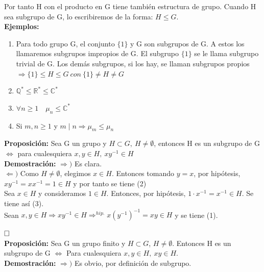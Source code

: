 \documentclass{article}
\begin{document}
Por tanto H con el producto en G tiene también estructura de grupo. Cuando H sea subgrupo de G, lo escribiremos de la forma: $H \leq G$. \\

\textbf{Ejemplos:}

\begin{enumerate}[1)]
\item Para todo grupo G, el conjunto $\{1\}$ y G son subgrupos de G. A estos los llamaremos subgrupos impropios de G. El subgrupo $\{1\}$ se le llama subgrupo trivial de G. Los demás subgrupos, si los hay, se llaman subgrupos propios $\Rightarrow \{1\} \leq H \leq G \: con \: \{1\}\neq H\neq G$

\item $\mathbb{Q}^*\leq \mathbb{R}^*\leq \mathbb{C}^*$

\item $\forall n \geq 1 \quad \mu_n\leq \mathbb{C}^*$

\item Si $m,n \geq 1$ y $m \mid n \Rightarrow \mu_m \leq \mu_n$
\end{enumerate}

\textbf{Proposición:} Sea G un grupo y $H \subset G,\: H\neq \emptyset$, entonces H es un subgrupo de G $\Leftrightarrow$ para cualesquiera $x,y\in H, \: xy^{-1}\in H$ \\

\textbf{Demostración:} $\Rightarrow)$ Es clara. \\

$\Leftarrow)$ Como $H \neq \emptyset$, elegimos $x \in H$. Entonces tomando $y=x$, por hipótesis, $xy^{-1}=xx^{-1}=1\in H$ y por tanto se tiene (2) \\

Sea $x\in H$ y consideramos $1 \in H$. Entonces, por hipótesis, $1\cdot x^{-1}=x^{-1}\in H$. Se tiene así (3). \\

Sean $x,y\in H\Rightarrow xy^{-1}\in H\Rightarrow^{hip.} x(y^{-1})^{-1}=xy\in H$ y se tiene (1).

$\hfill\square$ \\

\textbf{Proposición:} Sea G un grupo finito y $H \subset G$, $H \neq \emptyset$. Entonces H es un subgrupo de G $\Leftrightarrow$ Para cualesquiera $x,y\in H,\: xy\in H$. \\

\textbf{Demostración:} $\Rightarrow)$ Es obvio, por definición de subgrupo. \\
\end{document}
